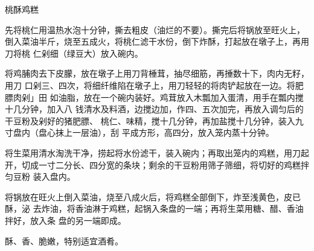 \begin{recipe}{桃酥鸡糕}

\ingredients


\preparation

\step 先将桃仁用温热水泡十分钟，撕去粗皮（油烂的不要）。撕完后将锅放至旺火上，
倒入菜油半斤，烧至五成火，将桃仁滤干水份，倒下炸酥，打起放在墩子上，再用刀将桃
仁剁细（绿豆大）放入碗内。

将鸡脯肉去下皮朦，放在墩子上用刀背棰茸，抽尽细筋，再捶数十下，肉内无籽，用刀
口剁三、四次，将细纤维陷在墩子上，用刀轻轻的将肉铲起放在一边。将肥膘肉剁」田
如油脂，放在一个碗内装好。鸡茸放入木瓢加入蛋清，用手在瓢内搅十几分钟，加入八
钱清水及料酒，边搅边加，作四、五次加完，再放入调匀后的干豆粉及剁好的猪肥膘、
桃仁、味精，搅十几分钟，再加盐搅十几分钟，装入九寸盘内（盘心抹上一层油），刮
平成方形，高四分，放入笼内蒸十分钟。

\step 将生菜用清水淘洗干净，捞起将水份滤干，装入碗内；再取出笼内的鸡糕，用刀起
开，切成一寸二分长、四分宽的条块；剩余的干豆粉用筛子筛细，将切好的鸡糕拌匀豆粉
装入盘内。

将锅放在旺火上倒入菜油，烧至八成火后，将鸡糕全部倒下，炸至浅黄色，皮已酥，泌
去炸油，将香油淋于鸡糕，起锅入条盘的一端；再将生菜用糖、醋、香油拌好，放入条
盘的另一端即成。

\features

酥、香、脆嫩，特别适宜酒肴。

\end{recipe}

